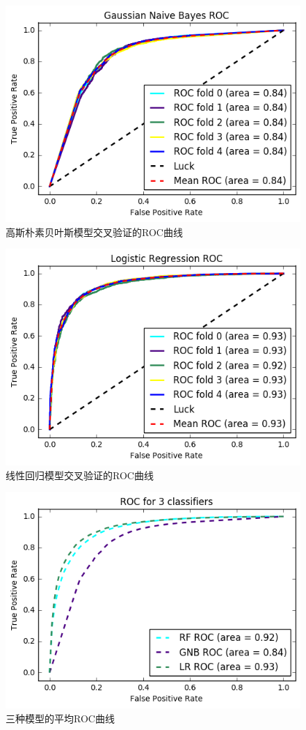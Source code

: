 \begin{figure}[p]
\centering
\includegraphics[width=0.9\linewidth]{gnb_roc}
\caption[gnb_roc]{高斯朴素贝叶斯模型交叉验证的ROC曲线}
\label{fig:gnbroc}
\end{figure}

\begin{figure}[p]
\centering
\includegraphics[width=0.9\linewidth]{lr_roc}
\caption[lr_roc]{线性回归模型交叉验证的ROC曲线}
\label{fig:lrroc}
\end{figure}

\begin{figure}[p]
\centering
\includegraphics[width=0.9\linewidth]{3c_roc}
\caption[3c_roc]{三种模型的平均ROC曲线}
\label{fig:3croc}
\end{figure}

